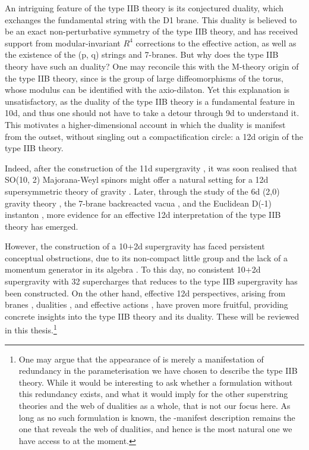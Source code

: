 An intriguing feature of the type IIB theory is its conjectured \SLZ{} duality, which exchanges the fundamental string with the D1 brane.
This duality is believed to be an exact non-perturbative symmetry of the type IIB theory, and has received support from modular-invariant $R^4$ corrections to the effective action, as well as the existence of the (p, q) strings and 7-branes.
But why does the type IIB theory have such an \SLZ{} duality?
One may reconcile this with the M-theory origin of the type IIB theory, since \SLZ{} is the group of large diffeomorphisms of the torus, whose modulus can be identified with the axio-dilaton.
Yet this explanation is unsatisfactory, as the \SLZ{} duality of the type IIB theory is a fundamental feature in 10d, and thus one should not have to take a detour through 9d to understand it.
This motivates a higher-dimensional account in which the duality is manifest from the outset, without singling out a compactification circle: a 12d origin of the type IIB theory.

Indeed, after the construction of the 11d supergravity \cite{Nahm:1977tg,Cremmer1978}, it was soon realised that SO(10, 2) Majorana-Weyl spinors might offer a natural setting for a 12d supersymmetric theory of gravity \cite{Castellani:1982ke,Blencowe:1988sk}.
Later, through the study of the 6d (2,0) gravity theory \cite{Hull:1995xh,Witten:1995em}, the 7-brane backreacted vacua \cite{Vafa:1996xn}, and the Euclidean D(-1) instanton \cite{Tseytlin:1996it}, more evidence for an effective 12d interpretation of the type IIB theory has emerged.

However, the construction of a 10+2d supergravity \cite{Nishino:1997gq} has faced persistent conceptual obstructions, due to its non-compact little group and the lack of a momentum generator in its algebra \cite{Hewson:1997wv}.
To this day, no consistent 10+2d supergravity with 32 supercharges that reduces to the type IIB supergravity has been constructed. 
On the other hand, effective 12d perspectives, arising from branes \cite{Tseytlin:1996ne}, dualities \cite{Tseytlin:1996it}, and effective actions \cite{Minasian:2015bxa}, have proven more fruitful, providing concrete insights into the type IIB theory and its \SLZ{} duality.
These will be reviewed in this thesis.\footnote{
One may argue that the appearance of \SLZ{} is merely a manifestation of redundancy in the parameterisation we have chosen to describe the type IIB theory.
While it would be interesting to ask whether a formulation without this redundancy exists, and what it would imply for the other superstring theories and the web of dualities as a whole, that is not our focus here.
As long as no such formulation is known, the \SLZ{}-manifest description remains the one that reveals the web of dualities, and hence is the most natural one we have access to at the moment.
}

